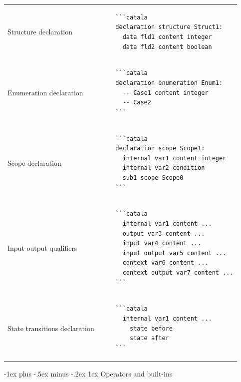 \documentclass{article}
\makeatletter
\newcommand\articlenormalsize{\fontsize{10pt}{12pt}\selectfont}
\renewcommand{\section}{\@startsection{section}{1}{0mm}%
                                {-1ex plus -.5ex minus -.2ex}%
                                {1ex}%
                                {\normalfont\articlenormalsize\bfseries}}
\newenvironment{catala}{%
  \VerbatimEnvironment
  \let\FV@ListVSpace\relax
  \begin{verbatim}}%
 {\end{verbatim}}
\makeatother
\begin{document}
\begin{multicols}{3}
\begin{tabular}{@{}p{\cola}p{\colb}@{}}
  Structure declaration &
  \begin{catala}
    ```catala
    declaration structure Struct1:
      data fld1 content integer
      data fld2 content boolean
  \end{catala}
  \\
  Enumeration declaration & \begin{catala}
    ```catala
    declaration enumeration Enum1:
      -- Case1 content integer
      -- Case2
    ```
  \end{catala}
  \\
  Scope declaration & \begin{catala}
    ```catala
    declaration scope Scope1:
      internal var1 content integer
      internal var2 condition
      sub1 scope Scope0
    ```
  \end{catala}
  \\
  Input-output qualifiers & \begin{catala}
    ```catala
      internal var1 content ...
      output var3 content ...
      input var4 content ...
      input output var5 content ...
      context var6 content ...
      context output var7 content ...
    ```
  \end{catala}
  \\
  State transitions declaration & \begin{catala}
    ```catala
      internal var1 content ...
        state before
        state after
    ```
  \end{catala}
  \\
\end{tabular}

\section{Operators and built-ins}


\end{multicols}
\end{document}
